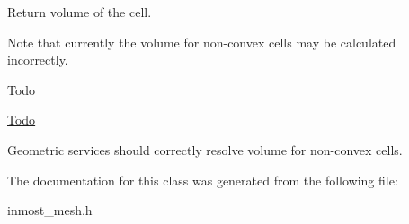 Return volume of the cell. 

Note that currently the volume for non-\/convex cells may be calculated incorrectly. \begin{DoxyRefDesc}{Todo}
\item[\hyperlink{todo__todo000007}{Todo}]
\begin{DoxyEnumerate}
\item Geometric services should correctly resolve volume for non-\/convex cells. 
\end{DoxyEnumerate}\end{DoxyRefDesc}


The documentation for this class was generated from the following file\-:\begin{DoxyCompactItemize}
\item 
inmost\-\_\-mesh.\-h\end{DoxyCompactItemize}
